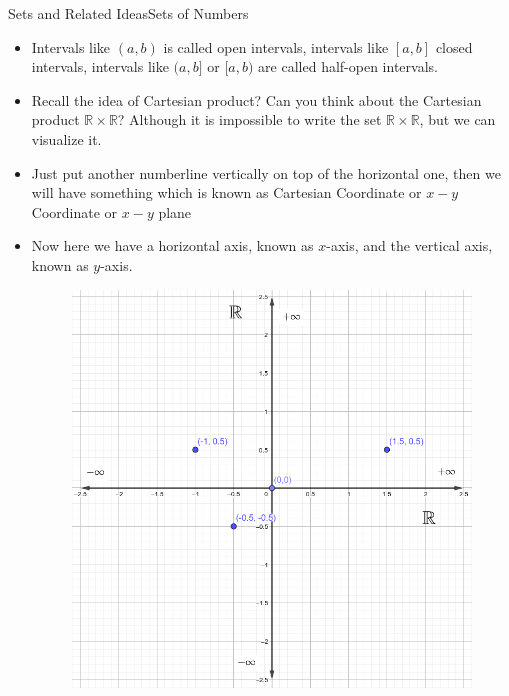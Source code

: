\documentclass[8pt,usepdftitle=false]{beamer}
\begin{document}
\begin{frame}[allowframebreaks]{Sets and Related Ideas}{Sets of Numbers}
\begin{itemize}
\item Intervals like $(a, b)$  is called \alert{open intervals}, intervals like $[a, b]$ \alert{closed intervals}, intervals like $(a, b]$ or $[a, b)$ are called \alert{half-open} intervals.



\item Recall the idea of Cartesian product? Can you think about the Cartesian product $\mathbb{R} \times \mathbb{R}$? Although it is impossible to write the set $\mathbb{R} \times \mathbb{R}$, but we can visualize it. 

\item Just put another numberline vertically on top of the horizontal one, then we will have something which is known as \alert{Cartesian Coordinate} or \alert{$x-y$ Coordinate} or \alert{$x-y$ plane}

\item Now here we have a horizontal axis, known as $x$-axis, and the vertical axis, known as $y$-axis.




\begin{figure}
\centering
\includegraphics[scale = .25]{Images/cartesian_coordinate.png}
\end{figure}




\begin{itemize}



\end{itemize}
\end{itemize}
\end{frame}
\end{document}
